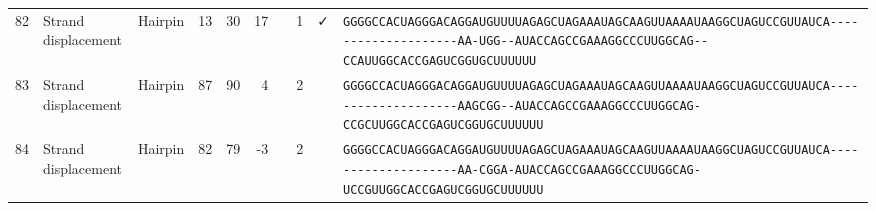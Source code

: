 \begin{tabular}{rllrrrrrcl}
 82 & Strand displacement & Hairpin & 13 & 30 & 17 &  & 1 & ✓ &                                                                                                                                                    
 \color{ucsfdarkgrey}\verb|GGGGCCACUAGGGACAGGAU|\color{ucsforange}\verb|GUUUUA|\color{ucsfblue}\verb|GAGCUAGAAAUAGCAAGU|\color{ucsforange}\verb|UAAAAUAA|\color{ucsfnavy}\verb|GGCUAGUCC|\color{ucsforange}\verb|GUUAUCA|\color{ucsfteal}\verb|--------------------AA-UGG--|\color{ucsfpurple}\verb|AUACCAGCCGAAAGGCCCUUGGCAG|\color{ucsfteal}\verb|--CCAUU|\color{ucsforange}\verb|GGCACCGAGUCGGUGCUUUUUU| \\
                                                                                                                                                                                                                   
 83 & Strand displacement & Hairpin & 87 & 90 & 4 &   & 2 &  &                                                                                                                                                     
 \color{ucsfdarkgrey}\verb|GGGGCCACUAGGGACAGGAU|\color{ucsforange}\verb|GUUUUA|\color{ucsfblue}\verb|GAGCUAGAAAUAGCAAGU|\color{ucsforange}\verb|UAAAAUAA|\color{ucsfnavy}\verb|GGCUAGUCC|\color{ucsforange}\verb|GUUAUCA|\color{ucsfteal}\verb|--------------------AAGCGG--|\color{ucsfpurple}\verb|AUACCAGCCGAAAGGCCCUUGGCAG|\color{ucsfteal}\verb|-CCGCUU|\color{ucsforange}\verb|GGCACCGAGUCGGUGCUUUUUU| \\
                                                                                                                                                                                                                   
 84 & Strand displacement & Hairpin & 82 & 79 & -3 &   & 2 &  &                                                                                                                                                    
 \color{ucsfdarkgrey}\verb|GGGGCCACUAGGGACAGGAU|\color{ucsforange}\verb|GUUUUA|\color{ucsfblue}\verb|GAGCUAGAAAUAGCAAGU|\color{ucsforange}\verb|UAAAAUAA|\color{ucsfnavy}\verb|GGCUAGUCC|\color{ucsforange}\verb|GUUAUCA|\color{ucsfteal}\verb|--------------------AA-CGGA-|\color{ucsfpurple}\verb|AUACCAGCCGAAAGGCCCUUGGCAG|\color{ucsfteal}\verb|-UCCGUU|\color{ucsforange}\verb|GGCACCGAGUCGGUGCUUUUUU| \\
                                                                                                                                                                                                                   

\end{tabular}
